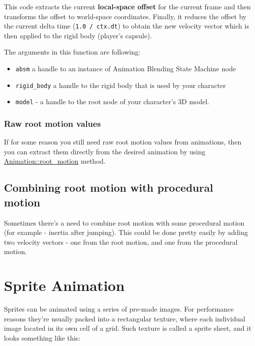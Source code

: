 \documentclass[
]{book}
\providecommand{\tightlist}{%
  \setlength{\itemsep}{0pt}\setlength{\parskip}{0pt}}
\theoremstyle{definition}
\theoremstyle{definition}
\theoremstyle{definition}
\theoremstyle{definition}
\theoremstyle{remark}
\begin{document}
This code extracts the current \textbf{local-space offset} for the current frame and then transforms the offset to world-space coordinates. Finally, it reduces the offset by the current delta time (\texttt{1.0\ /\ ctx.dt}) to obtain the new velocity vector which is then applied to the rigid body (player's capsule).

The arguments in this function are following:

\begin{itemize}
\tightlist
\item
  \texttt{absm} a handle to an instance of Animation Blending State Machine node
\item
  \texttt{rigid\_body} a handle to the rigid body that is used by your character
\item
  \texttt{model} - a handle to the root node of your character's 3D model.
\end{itemize}

\subsubsection{Raw root motion values}\label{raw-root-motion-values}

If for some reason you still need raw root motion values from animations, then you can extract them directly from the desired animation by using \href{https://docs.rs/fyrox/latest/fyrox/animation/struct.Animation.html\#method.root_motion}{Animation::root\_motion} method.

\subsection{Combining root motion with procedural motion}\label{combining-root-motion-with-procedural-motion}

Sometimes there's a need to combine root motion with some procedural motion (for example - inertia after jumping). This could be done pretty easily by adding two velocity vectors - one from the root motion, and one from the procedural motion.

\section{Sprite Animation}\label{sprite-animation}

Sprites can be animated using a series of pre-made images. For performance reasons they're usually packed into a rectangular texture, where each individual image located in its own cell of a grid. Such texture is called a sprite sheet, and it looks something like this:
\end{document}
